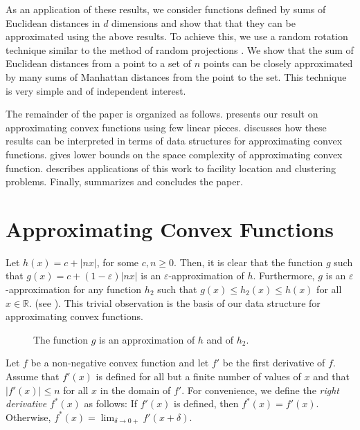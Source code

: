 \documentclass[charterfonts,lotsofwhite]{patmorin}
\newcommand{\eps}{\varepsilon}
\newcommand{\Real}{\mathbb{R}}
\begin{document}
As an application of these results, we consider functions defined by
sums of Euclidean distances in $d$ dimensions and show that that they
can be approximated using the above results.  To achieve this, we use
a random rotation technique similar to the method of random
projections \cite{i01}.  We show that the sum of Euclidean distances
from a point to a set of $n$ points can be closely approximated by
many sums of Manhattan distances from the point to the set.  This
technique is very simple and of independent interest.

The remainder of the paper is organized as follows.  
presents our result on approximating convex functions using few linear
pieces.   discusses how these results can be interpreted in
terms of data structures for approximating convex functions.
 gives lower bounds on the space complexity of
approximating convex function.   describes
applications of this work to facility location and clustering
problems.  Finally,  summarizes and concludes the
paper.

\section{Approximating Convex Functions}

Let $h(x)=c+|nx|$, for some $c,n\ge 0$.  Then, it is clear that the
function $g$ such that $g(x)=c+(1-\eps)|nx|$ is an
$\eps$-approximation of $h$.  Furthermore, $g$ is an
$\eps$-approximation for any function $h_2$ such that $g(x)\le
h_2(x)\le h(x)$ for all $x\in\Real$. (see ).  This
trivial observation is the basis of our data structure for
approximating convex functions.

\begin{figure}
\caption{The function $g$ is an approximation of $h$ and
of $h_2$.}
\end{figure}

Let $f$ be a non-negative convex function and let $f'$ be the first
derivative of $f$.  Assume that $f'(x)$ is defined for all but a
finite number of values of $x$ and that $|f'(x)|\le n$ for all $x$ in
the domain of $f'$.  For convenience, we define the \emph{right
derivative} $f^*(x)$ as follows: If $f'(x)$ is defined, then
$f^*(x)=f'(x)$.  Otherwise, $f^*(x)=\lim_{\delta\rightarrow 0+}
f'(x+\delta)$.
\end{document}
